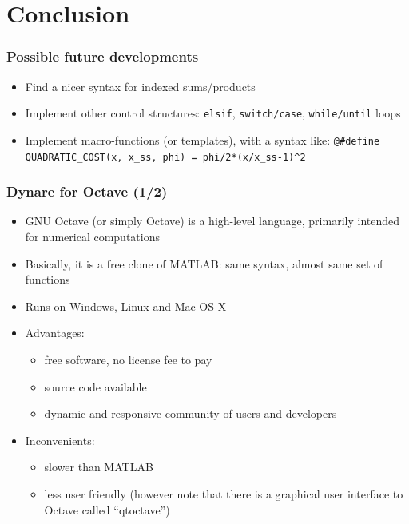 \documentclass{beamer}
\begin{document}
\section{Conclusion}

\begin{frame}[fragile=singleslide]
  \frametitle{Possible future developments}
  \begin{itemize}
  \item Find a nicer syntax for indexed sums/products
  \item Implement other control structures: \texttt{elsif}, \texttt{switch/case}, \texttt{while/until} loops
  \item Implement macro-functions (or templates), with a syntax like:
    \small
    \verb+@#define QUADRATIC_COST(x, x_ss, phi) = phi/2*(x/x_ss-1)^2+
    \normalsize
  \end{itemize}
\end{frame}

\begin{frame}
  \frametitle{Dynare for Octave (1/2)}
  \begin{itemize}
  \item GNU Octave (or simply Octave) is a high-level language, primarily intended for numerical computations
  \item Basically, it is a free clone of MATLAB: same syntax, almost same set of functions
  \item Runs on Windows, Linux and Mac OS X
  \item Advantages:
    \begin{itemize}
    \item free software, no license fee to pay
    \item source code available
    \item dynamic and responsive community of users and developers
    \end{itemize}
  \item Inconvenients:
    \begin{itemize}
    \item slower than MATLAB
    \item less user friendly (however note that there is a graphical user
      interface to Octave called ``qtoctave'')
    \end{itemize}
  \end{itemize}
\end{frame}
\end{document}
